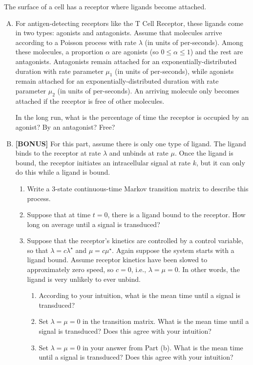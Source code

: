 \documentclass[12pt,letterpaper]{article}
\begin{document}
The surface of a cell has a receptor where ligands become attached. 

\begin{enumerate}[A.]


\item For antigen-detecting receptors like the T Cell Receptor, these ligands come in two types: agonists and antagonists. 
Assume that molecules arrive according to a Poisson process with rate $\lambda$ (in units of per-seconds). 
Among these molecules, a proportion $\alpha$ are agonists (so $0\leq \alpha \leq 1$) and the rest are antagonists. 
Antagonists remain attached for an exponentially-distributed duration with rate parameter $\mu_1$ (in units of per-seconds), while agonists remain attached for an exponentially-distributed duration with rate parameter $\mu_2$ (in units of per-seconds). 
An arriving molecule only becomes attached if the receptor is free of other molecules. 

In the long run, what is the percentage of time the receptor is occupied by an agonist? By an antagonist? Free?

\item \textbf{[BONUS]} For this part, assume there is only one type of ligand. The ligand binds to the receptor at rate $\lambda$ and unbinds at rate $\mu$. Once the ligand is bound, the receptor initiates an intracellular signal at rate $k$, but it can only do this while a ligand is bound. 

\begin{enumerate}
\item Write a 3-state continuous-time Markov transition matrix to describe this process. 

\item Suppose that at time $t=0$, there is a ligand bound to the receptor. How long on average until a signal is transduced?

\item Suppose that the receptor's kinetics are controlled by a control variable, so that $\lambda = c \lambda^\star$ and $\mu = c\mu^\star$. Again suppose the system starts with a ligand bound. Assume receptor kinetics have been slowed to approximately zero speed, so $c=0$, i.e., $\lambda=\mu=0$. In other words, the ligand is very unlikely to ever unbind.

\begin{enumerate}
\item According to your intuition, what is the mean time until a signal is transduced?
\item Set $\lambda=\mu=0$ in the transition matrix. What is the mean time until a signal is transduced? Does this agree with your intuition?
\item Set $\lambda=\mu=0$ in your answer from Part (b). What is the mean time until a signal is transduced? Does this agree with your intuition?
\end{enumerate}

\end{enumerate}


\end{enumerate}
\end{document}

